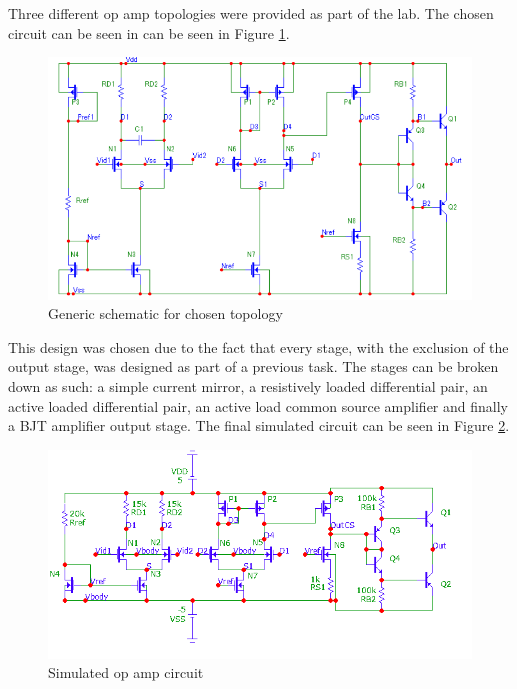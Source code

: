 



Three different op amp topologies were provided as part of the lab. The chosen circuit can be seen in can be seen in Figure \ref{fig:default}.

\begin{figure}[H]
    \begin{center}
    \includegraphics[scale=.45]{Simulations/default_circ.png}
    \caption{Generic schematic for chosen topology \cite{b2}}
    \label{fig:default}
    \end{center}
\end{figure}
This design was chosen due to the fact that every stage, with the exclusion of the output stage, was designed as part of a previous task. The stages can be broken down as such: a simple current mirror, a resistively loaded differential pair, an active loaded differential pair, an active load common source amplifier and finally a BJT amplifier output stage. The final simulated circuit can be seen in Figure \ref{fig:simcircuit}.

\begin{figure}[H]
    \begin{center}
    \includegraphics[scale=.55]{Simulations/simcircuit.png}
    \caption{Simulated op amp circuit}
    \label{fig:simcircuit}
    \end{center}
\end{figure}

